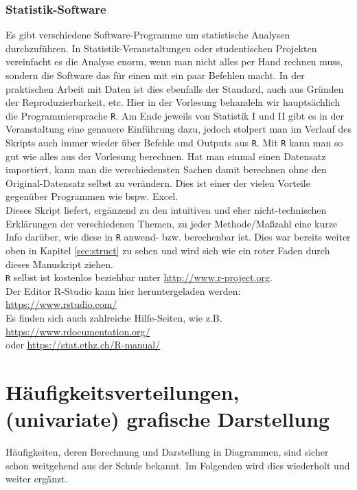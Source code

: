 \documentclass[a4paper]{article}
\begin{document}
\subsubsection{Statistik-Software}
Es gibt verschiedene Software-Programme um statistische Analysen durchzuführen. In Statistik-Veranstaltungen oder studentischen Projekten vereinfacht es die Analyse enorm, wenn man nicht alles per Hand rechnen muss, sondern die Software das für einen mit ein paar Befehlen macht. In der praktischen Arbeit mit Daten ist dies ebenfalls der Standard, auch aus Gründen der Reproduzierbarkeit, etc. Hier in der Vorlesung behandeln wir hauptsächlich die Programmiersprache \texttt{R}. Am Ende jeweils von Statistik I und II gibt es in der Veranstaltung eine genauere Einführung dazu, jedoch stolpert man im Verlauf des Skripts auch immer wieder über Befehle und Outputs aus \texttt{R}.
Mit \texttt{R} kann man so gut wie alles aus der Vorlesung berechnen. Hat man einmal einen Datensatz importiert, kann man die verschiedensten Sachen damit berechnen ohne den Original-Datensatz selbst zu verändern. Dies ist einer der vielen Vorteile gegenüber Programmen wie bspw. Excel.\\

\noindent Dieses Skript liefert, ergänzend zu den intuitiven und eher nicht-technischen Erklärungen der verschiedenen Themen, zu jeder Methode/Maßzahl eine kurze Info darüber, wie diese in \texttt{R} anwend- bzw. berechenbar ist. Dies war bereits weiter oben in Kapitel \ref{sec:struct} zu sehen und wird sich wie ein roter Faden durch dieses Manuskript ziehen.\\

\noindent \texttt{R} selbst ist kostenlos beziehbar unter \hfill \href{http://www.r-project.org}{http://www.r-project.org}.\\
\noindent Der Editor R-Studio kann hier heruntergeladen werden: \hfill \href{https://www.rstudio.com/}{https://www.rstudio.com/}\\
\noindent Es finden sich auch zahlreiche Hilfe-Seiten, wie z.B. \hfill \href{https://www.rdocumentation.org/}{https://www.rdocumentation.org/}\\
\noindent oder \hfill \href{https://stat.ethz.ch/R-manual/}{https://stat.ethz.ch/R-manual/}\\


\newpage


\section{Häufigkeitsverteilungen, (univariate) grafische Darstellung}
Häufigkeiten, deren Berechnung und Darstellung in Diagrammen, sind sicher schon weitgehend aus der Schule bekannt. Im Folgenden wird dies wiederholt und weiter ergänzt.
\end{document}
